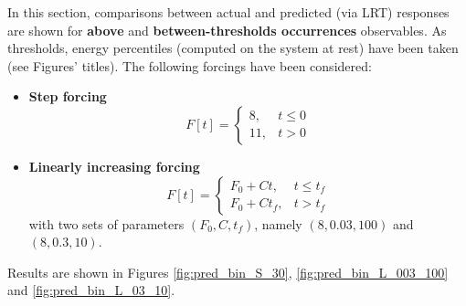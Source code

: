 \documentclass{article}
\begin{document}
In this section, comparisons between actual and predicted (via LRT) responses are shown for \textbf{above} and \textbf{between-thresholds occurrences} observables.
As thresholds, energy percentiles (computed on the system at rest) have been taken (see Figures' titles).
The following forcings have been considered:

\begin{itemize}
	\item \textbf{Step forcing}
		\begin{equation}
		F[t]=\left\{\begin{array}{ll}{8,} & {t \leq 0} \\ {11,} & {t > 0}\end{array}\right.
		\end{equation}		
	\item \textbf{Linearly increasing forcing}
		\begin{equation}
		F[t]=\left\{\begin{array}{ll}{F_0 + C t,} & {t \leq t_f} \\ {F_0 + C t_f,} & {t > t_f}\end{array}\right.
		\end{equation}
		with two sets of parameters $(F_0, C, t_f)$, namely $(8, 0.03, 100)$ and $(8, 0.3, 10)$.
\end{itemize}
Results are shown in Figures \ref{fig:pred_bin_S_30}, \ref{fig:pred_bin_L_003_100} and \ref{fig:pred_bin_L_03_10}.
\end{document}
